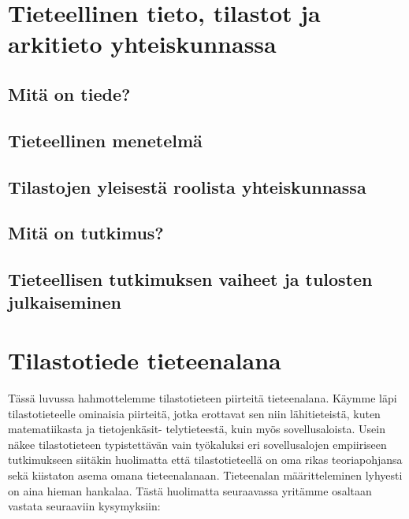 \documentclass[
]{book}
\begin{document}
\hypertarget{luku2}{%
\chapter{Tieteellinen tieto, tilastot ja arkitieto yhteiskunnassa}\label{luku2}}

\hypertarget{alaluku21}{%
\section{Mitä on tiede?}\label{alaluku21}}

\hypertarget{alaluku22}{%
\section{Tieteellinen menetelmä}\label{alaluku22}}

\hypertarget{alaluku23}{%
\section{Tilastojen yleisestä roolista yhteiskunnassa}\label{alaluku23}}

\hypertarget{alaluku24}{%
\section{Mitä on tutkimus?}\label{alaluku24}}

\hypertarget{alaluku25}{%
\section{Tieteellisen tutkimuksen vaiheet ja tulosten julkaiseminen}\label{alaluku25}}

\hypertarget{tilastotiede-tieteenalana}{%
\chapter{Tilastotiede tieteenalana}\label{tilastotiede-tieteenalana}}

Tässä luvussa hahmottelemme tilastotieteen piirteitä tieteenalana. Käymme läpi tilastotieteelle
ominaisia piirteitä, jotka erottavat sen niin lähitieteistä, kuten matematiikasta ja tietojenkäsit-
telytieteestä, kuin myös sovellusaloista. Usein näkee tilastotieteen typistettävän vain työkaluksi
eri sovellusalojen empiiriseen tutkimukseen siitäkin huolimatta että tilastotieteellä on oma rikas
teoriapohjansa sekä kiistaton asema omana tieteenalanaan.
Tieteenalan määritteleminen lyhyesti on aina hieman hankalaa. Tästä huolimatta seuraavassa
yritämme osaltaan vastata seuraaviin kysymyksiin:
\end{document}
